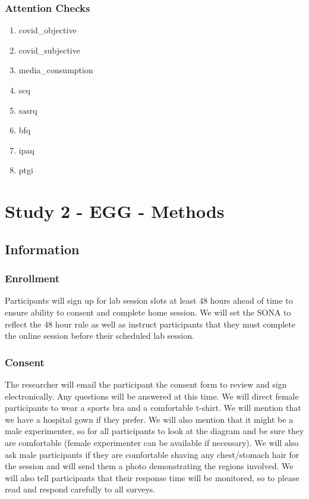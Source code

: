 \documentclass[]{book}
\providecommand{\tightlist}{%
  \setlength{\itemsep}{0pt}\setlength{\parskip}{0pt}}
\begin{document}
\hypertarget{attention-checks-1}{%
\subsection{Attention Checks}\label{attention-checks-1}}

\begin{enumerate}
\def\labelenumi{\arabic{enumi}.}
\tightlist
\item
  covid\_objective
\item
  covid\_subjective
\item
  media\_consumption
\item
  scq
\item
  sasrq
\item
  bfq
\item
  ipaq
\item
  ptgi
\end{enumerate}

\hypertarget{study-2---egg---methods}{%
\chapter{Study 2 - EGG - Methods}\label{study-2---egg---methods}}

\hypertarget{information-2}{%
\section{Information}\label{information-2}}

\hypertarget{enrollment}{%
\subsection{Enrollment}\label{enrollment}}

Participants will sign up for lab session slots at least 48 hours ahead of time to ensure ability to consent and complete home session. We will set the SONA to reflect the 48 hour rule as well as instruct participants that they must complete the online session before their scheduled lab session.

\hypertarget{consent}{%
\subsection{Consent}\label{consent}}

The researcher will email the participant the consent form to review and sign electronically. Any questions will be answered at this time. We will direct female participants to wear a sports bra and a comfortable t-shirt. We will mention that we have a hospital gown if they prefer. We will also mention that it might be a male experimenter, so for all participants to look at the diagram and be sure they are comfortable (female experimenter can be available if necessary). We will also ask male participants if they are comfortable shaving any chest/stomach hair for the session and will send them a photo demonstrating the regions involved. We will also tell participants that their response time will be monitored, so to please read and respond carefully to all surveys.
\end{document}
